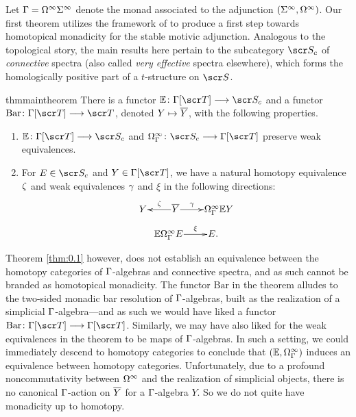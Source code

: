 \documentclass{amsart}
\theoremstyle{definition}
\begin{document}
Let $\Gamma = \Omega^{\infty} \Sigma^{\infty}$ denote the monad associated to the adjunction $(\Sigma^{\infty},\Omega^{\infty})$. Our first theorem utilizes the framework of \cite{KMZ25} to produce a first step towards homotopical monadicity for the stable motivic adjunction. Analogous to the topological story, the main results here pertain to the subcategory $\sS_c$ of \emph{connective} spectra (also called \emph{very effective} spectra elsewhere), which forms the homologically positive part of a $t$-structure on $\sS$.
\begin{restatable}{thm}{maintheorem}\label{thm:0.1}
    There is a functor $\bE \colon \GA[\sT] \rtarr \sS_c$ and a functor $\mathrm{Bar} \colon \GA[\sT] \rtarr \sT$, denoted $Y \mapsto \overline{Y}$, with the following properties.
    \begin{enumerate}
        \item $\bE \colon \GA[\sT] \rtarr \sS_c$ and $\OM^{\infty}_{\GA} \colon \sS_c \rtarr \GA[\sT]$ preserve weak equivalences. 
        \item For $E \in \sS_c$ and $Y \in \GA[\sT]$, we have a natural homotopy equivalence $\zeta$ and weak equivalences $\gamma$ and $\xi$ in the following directions:
    \[\xymatrix@1{Y & \ar[l]_-{\ze} \overline{Y} \ar[r]^-{\ga} & \OM^{\infty}_{\GA}\bE Y}\]
    \[\xymatrix@1{ \bE \OM^{\infty}_{\GA} E \ar[r]^-{\xi} & E.}\]
    \end{enumerate}
\end{restatable}

Theorem \ref{thm:0.1} however, does not establish an equivalence between the homotopy categories of $\Gamma$-algebras and connective spectra, and as such cannot be branded as homotopical monadicity. The functor $\mathrm{Bar}$ in the theorem alludes to the two-sided monadic bar resolution of $\Gamma$-algebras, built as the realization of a simplicial $\Gamma$-algebra---and as such we would have liked a functor $\mathrm{Bar} \colon \GA [\sT] \rtarr \GA[\sT]$. Similarly, we may have also liked for the weak equivalences in the theorem to 
be maps of $\Gamma$-algebras. In such a setting, we could immediately descend to homotopy categories to conclude that $(\mathbb{E},\Omega^{\infty}_{\Gamma})$ induces an equivalence between homotopy categories. Unfortunately, due to a profound noncommutativity between $\Omega^{\infty}$ and the realization of simplicial objects, there is no canonical $\Gamma$-action on $\overline{Y}$ for a $\Gamma$-algebra $Y$. So we do not quite have monadicity up to homotopy.
\end{document}
